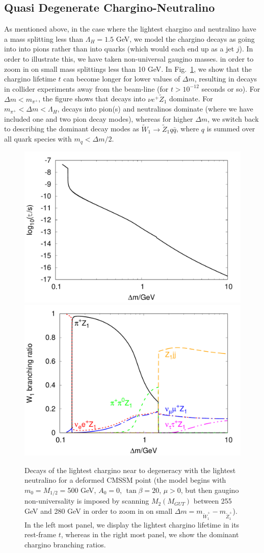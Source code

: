 \documentclass[final,3p,times]{elsarticle}
\begin{document}
\subsection{Quasi Degenerate Chargino-Neutralino} \label{quasi}
As mentioned above, in 
the case where the lightest chargino and neutralino have a mass splitting
 less
than $\Lambda_H=1.5$ GeV, we model the chargino decays as going into 
into pions rather than into quarks (which would each end up as a jet $j$). In
order to 
illustrate this, we have taken non-universal gaugino masses.  in order to zoom
in on small mass splittings less than 10 GeV. In Fig.~\ref{fig:chdk}, we show
that the chargino lifetime $t$ can become longer for lower values of
$\Delta m$, resulting in decays in collider experiments away from the
beam-line (for $t> 10^{-12}$ seconds or so). For $\Delta m<m_{\pi^+}$, the
figure shows that decays into $\nu e^+ {\tilde Z}_1$ dominate. For $m_{\pi^+}
< \Delta m < \Lambda_H$, decays into pion(s) and neutralinos dominate (where
we have included one and two pion decay modes), whereas for higher $\Delta m$,
we switch back to describing the dominant decay modes as ${\tilde W}_1
\rightarrow {\tilde Z}_1 q \bar q$, where $q$ is summed over all quark species
with $m_q < \Delta m/2$.
\begin{figure}
\includegraphics[width=0.5 \textwidth]{anc/chiLifetime}
\includegraphics[width=0.5 \textwidth]{anc/chiDK}
\caption{Decays of the lightest chargino near to degeneracy with the lightest
  neutralino for a deformed CMSSM point (the model begins with $m_0=M_{1/2}=$500
  GeV, 
$A_0=0$, $\tan \beta=20$, $\mu>0$, but then gaugino non-universality is
imposed by scanning $M_2(M_{GUT})$ between 255 GeV and 280 GeV in order to
zoom in on small $\Delta m=m_{{\tilde W}_1^+} - m_{{\tilde 
    Z}_1^+}$). In the left most panel, we display the lightest chargino
lifetime in its rest-frame $t$, whereas in the right most panel, we show the
dominant chargino branching ratios.\label{fig:chdk}}
\end{figure}
\end{document}
